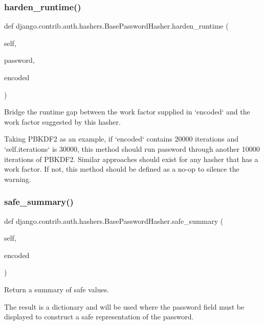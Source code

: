 \subsubsection{\texorpdfstring{harden\+\_\+runtime()}{harden\_runtime()}}
{\footnotesize\ttfamily def django.\+contrib.\+auth.\+hashers.\+Base\+Password\+Hasher.\+harden\+\_\+runtime (\begin{DoxyParamCaption}\item[{}]{self,  }\item[{}]{password,  }\item[{}]{encoded }\end{DoxyParamCaption})}

\begin{DoxyVerb}Bridge the runtime gap between the work factor supplied in `encoded`
and the work factor suggested by this hasher.

Taking PBKDF2 as an example, if `encoded` contains 20000 iterations and
`self.iterations` is 30000, this method should run password through
another 10000 iterations of PBKDF2. Similar approaches should exist
for any hasher that has a work factor. If not, this method should be
defined as a no-op to silence the warning.
\end{DoxyVerb}
 \mbox{\label{classdjango_1_1contrib_1_1auth_1_1hashers_1_1_base_password_hasher_a8ae674a5aed2af797992225ef54bd92f}} 
\subsubsection{\texorpdfstring{safe\+\_\+summary()}{safe\_summary()}}
{\footnotesize\ttfamily def django.\+contrib.\+auth.\+hashers.\+Base\+Password\+Hasher.\+safe\+\_\+summary (\begin{DoxyParamCaption}\item[{}]{self,  }\item[{}]{encoded }\end{DoxyParamCaption})}

\begin{DoxyVerb}Return a summary of safe values.

The result is a dictionary and will be used where the password field
must be displayed to construct a safe representation of the password.
\end{DoxyVerb}
 \mbox{\label{classdjango_1_1contrib_1_1auth_1_1hashers_1_1_base_password_hasher_a6761698d81d6070e4aa046fe6b7116f7}} 
